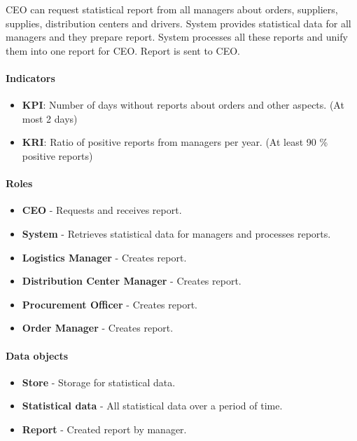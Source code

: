 \documentclass[11pt,a4paper]{article}
\begin{document}
CEO can request statistical report from all managers about orders, suppliers, supplies, distribution centers and drivers. System provides statistical data for all managers and they prepare report. System processes all these reports and unify them into one report for CEO. Report is sent to CEO.

\paragraph{Indicators}

\begin{itemize}
    \item \textbf{KPI}: Number of days without reports about orders and other aspects. (At most 2 days)
    \item \textbf{KRI}: Ratio of positive reports from managers per year. (At least 90 \% positive reports)
\end{itemize}

\paragraph{Roles}

\begin{itemize}
    \item \textbf{CEO} - Requests and receives report.
    \item \textbf{System} - Retrieves statistical data for managers and processes reports.
    \item \textbf{Logistics Manager} - Creates report.
    \item \textbf{Distribution Center Manager} - Creates report.
    \item \textbf{Procurement Officer} - Creates report.
    \item \textbf{Order Manager} - Creates report.
\end{itemize}

\paragraph{Data objects}

\begin{itemize}
    \item \textbf{Store} - Storage for statistical data.
    \item \textbf{Statistical data} - All statistical data over a period of time.
    \item \textbf{Report} - Created report by manager.
\end{itemize}
\end{document}

